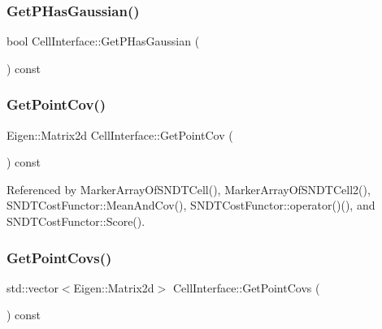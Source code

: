 \subsubsection{\texorpdfstring{Get\+P\+Has\+Gaussian()}{GetPHasGaussian()}}
{\footnotesize\ttfamily bool Cell\+Interface\+::\+Get\+P\+Has\+Gaussian (\begin{DoxyParamCaption}{ }\end{DoxyParamCaption}) const\hspace{0.3cm}{\ttfamily [inline]}}

\mbox{\label{classCellInterface_a774cd7acb975d19866616540357c8974}} 
\subsubsection{\texorpdfstring{Get\+Point\+Cov()}{GetPointCov()}}
{\footnotesize\ttfamily Eigen\+::\+Matrix2d Cell\+Interface\+::\+Get\+Point\+Cov (\begin{DoxyParamCaption}{ }\end{DoxyParamCaption}) const\hspace{0.3cm}{\ttfamily [inline]}}



Referenced by Marker\+Array\+Of\+S\+N\+D\+T\+Cell(), Marker\+Array\+Of\+S\+N\+D\+T\+Cell2(), S\+N\+D\+T\+Cost\+Functor\+::\+Mean\+And\+Cov(), S\+N\+D\+T\+Cost\+Functor\+::operator()(), and S\+N\+D\+T\+Cost\+Functor\+::\+Score().

\mbox{\label{classCellInterface_a8f2a59b5ee0c5e9971751e9475b8946e}} 
\subsubsection{\texorpdfstring{Get\+Point\+Covs()}{GetPointCovs()}}
{\footnotesize\ttfamily std\+::vector$<$Eigen\+::\+Matrix2d$>$ Cell\+Interface\+::\+Get\+Point\+Covs (\begin{DoxyParamCaption}{ }\end{DoxyParamCaption}) const\hspace{0.3cm}{\ttfamily [inline]}}

\mbox{\label{classCellInterface_a901b89d5b89a4029d41b97ce2ac380a8}} 
